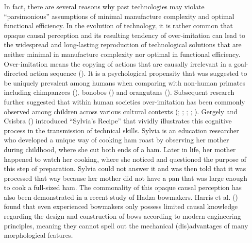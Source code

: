 \documentclass[
  11pt,
  letterpaper,
  DIV=11,
  numbers=noendperiod]{scrartcl}
\begin{document}
In fact, there are several reasons why past technologies may violate
``parsimonious'' assumptions of minimal manufacture complexity and
optimal functional efficiency. In the evolution of technology, it is
rather common that opaque causal perception and its resulting tendency
of over-imitation can lead to the widespread and long-lasting
reproduction of technological solutions that are neither minimal in
manufacture complexity nor optimal in functional efficiency.
Over-imitation means the copying of actions that are causally irrelevant
in a goal-directed action sequence (). It is a psychological propensity that was suggested to be
uniquely prevalent among humans when comparing with non-human primates
including chimpanzees (), bonobos () and
orangutans (). Subsequent research further suggested that within
human societies over-imitation has been commonly observed among children
across various cultural contexts (; ;
;
;
). Gergely and Csisbra
() introduced ``Sylvia's Recipe'' that
vividly illustrates this cognitive process in the transmission of
technical skills. Sylvia is an education researcher who developed a
unique way of cooking ham roast by observing her mother during
childhood, where she cut both ends of a ham. Later in life, her mother
happened to watch her cooking, where she noticed and questioned the
purpose of this step of preparation. Sylvia could not answer it and was
then told that it was processed that way because her mother did not have
a pan that was large enough to cook a full-sized ham. The commonality of
this opaque causal perception has also been demonstrated in a recent
study of Hadza bowmakers. Harris et al.
() found that even experienced bowmakers
only possess limited causal knowledge regarding the design and
construction of bows according to modern engineering principles, meaning
they cannot spell out the mechanical (dis)advantages of many
morphological features.
\end{document}
